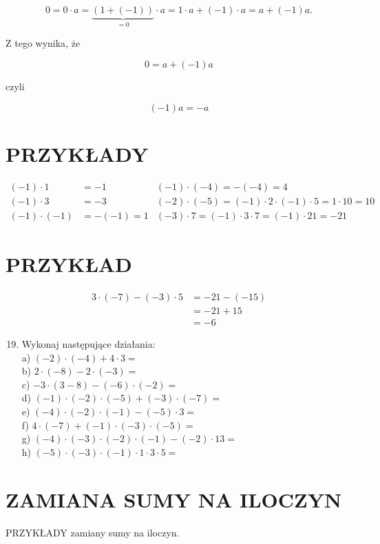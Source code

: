 \documentclass[10pt]{article}
\begin{document}
\[
0=0 \cdot a=\underbrace{(1+(-1))}_{=0} \cdot a=1 \cdot a+(-1) \cdot a=a+(-1) a .
\]

Z tego wynika, że

\[
0=a+(-1) a
\]

czyli

\[
(-1) a=-a
\]

\section*{PRZYKŁADY}
\[
\begin{aligned}
(-1) \cdot 1 & =-1 & (-1) \cdot(-4)=-(-4)=4 \\
(-1) \cdot 3 & =-3 & (-2) \cdot(-5)=(-1) \cdot 2 \cdot(-1) \cdot 5=1 \cdot 10=10 \\
(-1) \cdot(-1) & =-(-1)=1 & (-3) \cdot 7=(-1) \cdot 3 \cdot 7=(-1) \cdot 21=-21
\end{aligned}
\]

\section*{PRZYKŁAD}
\[
\begin{aligned}
3 \cdot(-7)-(-3) \cdot 5 & =-21-(-15) \\
& =-21+15 \\
& =-6
\end{aligned}
\]

\begin{enumerate}
  \setcounter{enumi}{18}
  \item Wykonaj następujące działania:\\
a) \((-2) \cdot(-4)+4 \cdot 3=\)\\
b) \(2 \cdot(-8)-2 \cdot(-3)=\)\\
c) \(-3 \cdot(3-8)-(-6) \cdot(-2)=\)\\
d) \((-1) \cdot(-2) \cdot(-5)+(-3) \cdot(-7)=\)\\
e) \((-4) \cdot(-2) \cdot(-1)-(-5) \cdot 3=\)\\
f) \(4 \cdot(-7)+(-1) \cdot(-3) \cdot(-5)=\)\\
g) \((-4) \cdot(-3) \cdot(-2) \cdot(-1)-(-2) \cdot 13=\)\\
h) \((-5) \cdot(-3) \cdot(-1) \cdot 1 \cdot 3 \cdot 5=\)
\end{enumerate}

\section*{ZAMIANA SUMY NA ILOCZYN}
PRZYKŁADY zamiany sumy na iloczyn.
\end{document}
